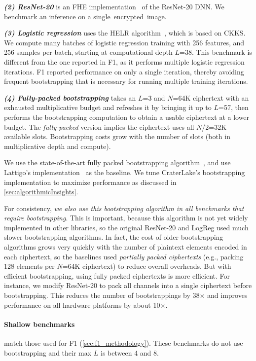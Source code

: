 \noindent \emph{\textbf{(2) ResNet-20}} is an FHE
implementation~\cite{lee:2021:privacy} of the ResNet-20 DNN. We benchmark an
inference on a single~encrypted~image.


\noindent \emph{\textbf{(3) Logistic regression}}
uses the HELR algorithm~\cite{han:aaai19:logistic}, which is based on CKKS. We
compute many batches of logistic regression training with 256 features, and 256
samples per batch, starting at computational depth $L$=38. This benchmark is
different from the one reported in F1, as it performs multiple logistic
regression iterations. F1 reported performance on only a single iteration,
thereby avoiding frequent bootstrapping that is necessary for running multiple
training iterations.

\noindent \emph{\textbf{(4) Fully-packed bootstrapping}}
takes an $L$=3 and $N$=64K ciphertext with an exhausted multiplicative budget
and refreshes it by bringing it up to $L$=57, then performs the bootstrapping
computation to obtain a usable ciphertext at a lower budget. The
\emph{fully-packed} version implies the ciphertext uses all $N$/2=32K available
slots. Bootstrapping costs grow with the number of slots (both in
multiplicative depth and compute).

We use the state-of-the-art fully packed bootstrapping
algorithm~\cite{mouchet2020lattigo}, and use Lattigo's
implementation~\cite{lattigo} as the baseline. We tune CraterLake's
bootstrapping implementation to maximize performance as discussed in
\autoref{sec:algorithmicInsights}.

For consistency, \emph{we also use this bootstrapping algorithm in all
benchmarks that require bootstrapping}. This is important, because this
algorithm is not yet widely implemented in other libraries, so the original
ResNet-20 and LogReg used much slower bootstrapping algorithms. In fact, the
cost of older bootstrapping algorithms grows very quickly with the number of
plaintext elements encoded in each ciphertext, so the baselines used
\emph{partially packed ciphertexts} (e.g., packing 128 elements per $N$=64K
ciphertext) to reduce overall overheads. But with efficient bootstrapping,
using fully packed ciphertexts is more efficient. For instance, we modify
ResNet-20 to pack all channels into a single ciphertext before bootstrapping.
This reduces the number of bootstrappings by 38$\times$ and improves
performance on all hardware platforms by about 10$\times$.

\paragraph{Shallow benchmarks} match those used for F1
(\autoref{sec:f1_methodology}). These benchmarks do not use bootstrapping and
their max $L$ is between 4 and 8.

